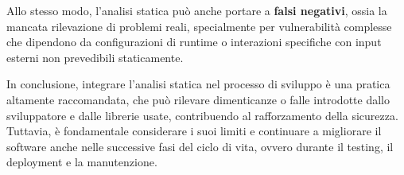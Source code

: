 Allo stesso modo, l'analisi statica può anche portare a \textbf{falsi negativi},
ossia la mancata rilevazione di problemi reali, specialmente per vulnerabilità complesse
che dipendono da configurazioni di runtime o interazioni specifiche con input esterni
non prevedibili staticamente.

In conclusione, integrare l'analisi statica nel processo di sviluppo è una
pratica altamente raccomandata, che può rilevare dimenticanze o falle introdotte
dallo sviluppatore e dalle librerie usate, contribuendo al rafforzamento della
sicurezza. Tuttavia, è fondamentale considerare i suoi limiti e continuare a
migliorare il software anche nelle successive fasi del ciclo di vita, ovvero durante
il testing, il deployment e la manutenzione.